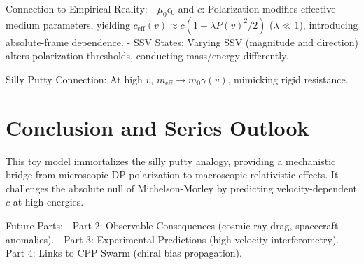 \documentclass[11pt]{article}
\begin{document}
Connection to Empirical Reality:
- $\mu_0 \epsilon_0$ and $c$: Polarization modifies effective medium parameters, yielding $c_{\text{eff}}(v) \approx c (1 - \lambda P(v)^2/2)$ ($\lambda \ll 1$), introducing absolute-frame dependence.
- SSV States: Varying SSV (magnitude and direction) alters polarization thresholds, conducting mass/energy differently.

Silly Putty Connection: At high $v$, $m_{\text{eff}} \to m_0 \gamma(v)$, mimicking rigid resistance.

\section{Conclusion and Series Outlook}

This toy model immortalizes the silly putty analogy, providing a mechanistic bridge from microscopic DP polarization to macroscopic relativistic effects. It challenges the absolute null of Michelson-Morley by predicting velocity-dependent $c$ at high energies.

Future Parts:
- Part 2: Observable Consequences (cosmic-ray drag, spacecraft anomalies).
- Part 3: Experimental Predictions (high-velocity interferometry).
- Part 4: Links to CPP Swarm (chiral bias propagation).


\end{document}
